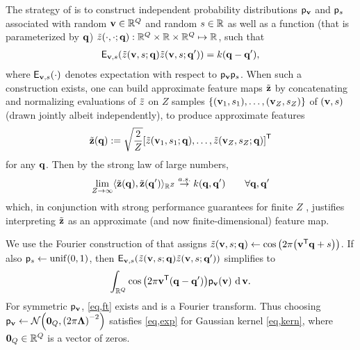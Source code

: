 The strategy of \cite{rahimi:07:rff}
is to construct independent probability distributions 
$\mathsf{p}_{\mathbf{v}}$ and $\mathsf{p}_{s}$
associated with
random $\mathbf{v} \in \mathbb{R}^{Q}$ 
and random $s \in \mathbb{R}$ 
as well as a function 
(that is parameterized by $\mathbf{q}$) 
$\zt\paren{\cdot,\cdot;\bmq} : 
	\reals{\dimQ} \times \real \times \reals{\dimQ} \mapsto \real$,
such that
\begin{align}
	\expect{\bmv,s}{
		\zta{\bmv,s;\bmq}
		\zta{\bmv,s;\bmq'} 
	}
	= k(\bmq-\bmq'),
	\label{eq,exp}
\end{align}
where 
$\expect{\bmv,s}{\cdot}$
denotes expectation with respect to $\mathsf{p}_{\mathbf{v}}\mathsf{p}_{s}$.
When such a construction exists,
one can build
approximate feature maps $\tilde{\mathbf{z}}$
by concatenating and normalizing evaluations 
of $\tilde{z}$ 
on $Z$ samples 
$\set{\paren{\bmv_1,s_1},\dots,\paren{\bmv_Z,s_Z}}$
of $\paren{\bmv,s}$
(drawn jointly albeit independently),
to produce approximate features
\begin{align}
	\bmztZa{\bmq} := \sqrt{\frac{2}{Z}}
		\brac{\zta{\bmv_1,s_1;\bmq},\dots,\zta{\bmv_Z,s_Z;\bmq}}\tpose
	\label{eq,feat}
\end{align}
for any $\mathbf{q}$. 
Then by the strong law of large numbers,
\begin{align}
	\lim_{Z \to \infty} \innprod{
		\bmztZa{\bmq}}{
		\bmztZa{\bmq'}
	}_{\reals{Z}} \overset{a.s.}{\to} k(\bmq,\bmq') \qquad \forall \bmq,\bmq'
	\label{eq,lln}
\end{align}
which, 
in conjunction 
with strong performance guarantees
for finite $Z$ \cite{rahimi:07:rff,sutherland:15:ote}, 
justifies interpreting $\tilde{\mathbf{z}}$ 
as an approximate 
(and now finite-dimensional) feature map.

We use the Fourier construction 
of \cite{rahimi:07:rff}
that assigns
$\zt\paren{\bmv,s;\bmq} 
\gets 
\cosa{2\pi\paren{\bmv\tpose \bmq + s}}$.
If also $\dist{s}\gets\unif{0,1}$, 
then 
$\expect{\bmv,s}{
	\zt\paren{\bmv,s;\bmq}
	\zt\paren{\bmv,s;\bmq'} 
}$
simplifies to
\begin{align}
	\int_{\reals{\dimQ}} \cosa{2\pi\bmv\tpose\paren{\bmq-\bmq'}} \dist{\bmv}\paren{\bmv} \der{\bmv}.
	\label{eq,ft}
\end{align}
For symmetric $\mathsf{p}_{\mathbf{v}}$,
\eqref{eq,ft} exists \cite{wu:97:gbt}
and is a Fourier transform.
Thus choosing 
$\dist{\bmv}\gets\gauss{\zeros{\dimQ}}{\paren{2\pi\bmL}^{-2}}$
satisfies \eqref{eq,exp}
for Gaussian kernel \eqref{eq,kern},
where $\boldsymbol{0}_{Q} \in \mathbb{R}^{Q}$ is a vector of zeros.

